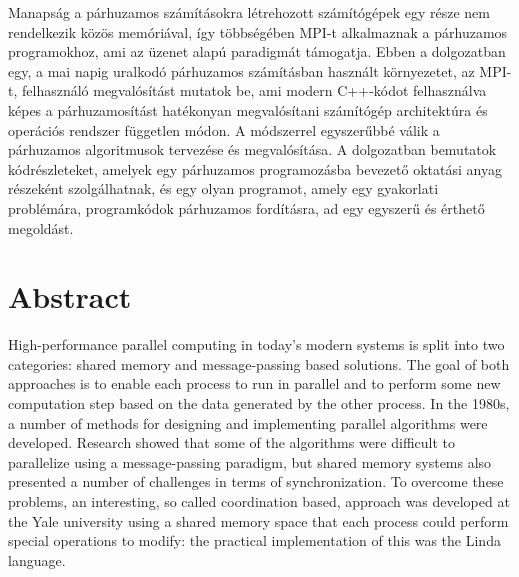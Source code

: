 Manapság a párhuzamos számításokra létrehozott számítógépek egy része nem rendelkezik közös memóriával, így többségében MPI-t alkalmaznak a párhuzamos programokhoz, ami az üzenet alapú paradigmát támogatja. Ebben a dolgozatban egy, a mai napig uralkodó párhuzamos számításban használt környezetet, az MPI-t, felhasználó megvalósítást mutatok be, ami modern C++-kódot felhasználva képes a párhuzamosítást hatékonyan megvalósítani számítógép architektúra és operációs rendszer független módon. A módszerrel egyszerűbbé válik a párhuzamos algoritmusok tervezése és megvalósítása. A dolgozatban bemutatok kódrészleteket, amelyek egy párhuzamos programozásba bevezető oktatási anyag részeként szolgálhatnak, és egy olyan programot, amely egy gyakorlati problémára, programkódok párhuzamos fordításra, ad egy egyszerű és érthető megoldást.

\vfill
\selectenglish


\chapter*{Abstract}

High-performance parallel computing in today's modern systems is split into two categories: shared memory and message-passing based solutions. The goal of both approaches is to enable each process to run in parallel and to perform some new computation step based on the data generated by the other process. In the 1980s, a number of methods for designing and implementing parallel algorithms were developed. Research showed that some of the algorithms were difficult to parallelize using a message-passing paradigm, but shared memory systems also presented a number of challenges in terms of synchronization. To overcome these problems, an interesting, so called coordination based, approach was developed at the Yale university using a shared memory space that each process could perform special operations to modify: the practical implementation of this was the Linda language.


